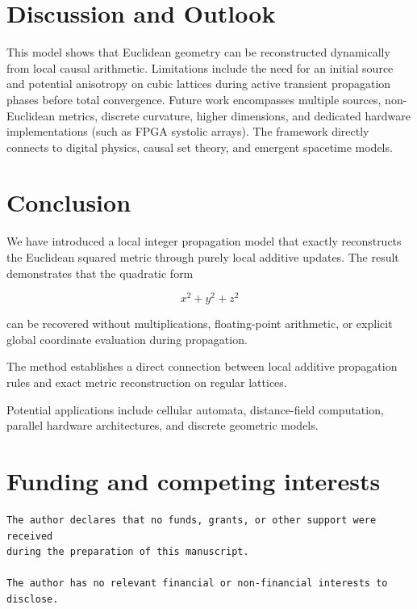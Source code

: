 \documentclass[11pt,a4paper]{article}
\begin{document}
\section{Discussion and Outlook}
\label{sec:discussion}

This model shows that Euclidean geometry can be reconstructed dynamically from local causal arithmetic. Limitations include the need for an initial source and potential anisotropy on cubic lattices during active transient propagation phases before total convergence. Future work encompasses multiple sources, non-Euclidean metrics, discrete curvature, higher dimensions, and dedicated hardware implementations (such as FPGA systolic arrays). The framework directly connects to digital physics, causal set theory, and emergent spacetime models.

\section{Conclusion}

We have introduced a local integer propagation model that exactly
reconstructs the Euclidean squared metric through purely local additive
updates. The result demonstrates that the quadratic form

\[
x^2+y^2+z^2
\]

can be recovered without multiplications, floating-point arithmetic,
or explicit global coordinate evaluation during propagation.

The method establishes a direct connection between local additive
propagation rules and exact metric reconstruction on regular lattices.

Potential applications include cellular automata, distance-field
computation, parallel hardware architectures, and discrete geometric
models.

\section*{Funding and competing interests}
\begin{verbatim}
The author declares that no funds, grants, or other support were received 
during the preparation of this manuscript.

The author has no relevant financial or non-financial interests to disclose.
\end{verbatim}
\end{document}
